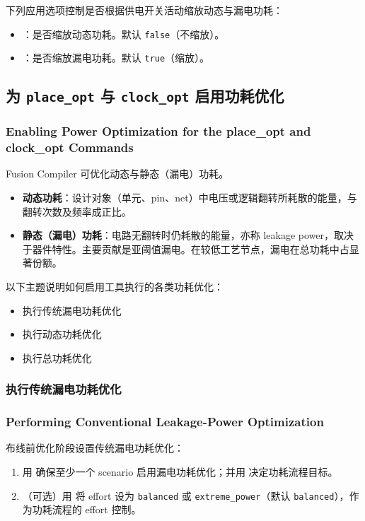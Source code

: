 下列应用选项控制是否根据供电开关活动缩放动态与漏电功耗：
\begin{itemize}
  \item {}：是否缩放动态功耗。默认 \texttt{false}（不缩放）。
  \item {}：是否缩放漏电功耗。默认 \texttt{true}（缩放）。
\end{itemize}

\subsection{为 \texttt{place\_opt} 与 \texttt{clock\_opt} 启用功耗优化}
\subsubsection*{Enabling Power Optimization for the place\_opt and clock\_opt Commands}

Fusion Compiler 可优化动态与静态（漏电）功耗。
\begin{itemize}
  \item \textbf{动态功耗}：设计对象（单元、pin、net）中电压或逻辑翻转所耗散的能量，与翻转次数及频率成正比。
  \item \textbf{静态（漏电）功耗}：电路无翻转时仍耗散的能量，亦称 leakage power，取决于器件特性。主要贡献是亚阈值漏电。在较低工艺节点，漏电在总功耗中占显著份额。
\end{itemize}

以下主题说明如何启用工具执行的各类功耗优化：
\begin{itemize}
  \item 执行传统漏电功耗优化
  \item 执行动态功耗优化
  \item 执行总功耗优化
\end{itemize}

\subsubsection{执行传统漏电功耗优化}
\subsubsection*{Performing Conventional Leakage-Power Optimization}

布线前优化阶段设置传统漏电功耗优化：
\begin{enumerate}
  \item 用  确保至少一个 scenario 启用漏电功耗优化；并用  决定功耗流程目标。
  \item （可选）用  将 effort 设为 \texttt{balanced} 或 \texttt{extreme\_power}（默认 \texttt{balanced}），作为功耗流程的 effort 控制。
\end{enumerate}

